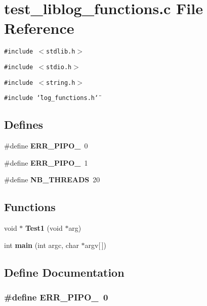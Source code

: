 \section{test\_\-liblog\_\-functions.c File Reference}
\label{test__liblog__functions_8c}
{\tt \#include $<$stdlib.h$>$}\par
{\tt \#include $<$stdio.h$>$}\par
{\tt \#include $<$string.h$>$}\par
{\tt \#include \char`\"{}log\_\-functions.h\char`\"{}}\par
\subsection*{Defines}
\begin{CompactItemize}
\item 
\#define {\bf ERR\_\-PIPO\_}~0
\item 
\#define {\bf ERR\_\-PIPO\_}~1
\item 
\#define {\bf NB\_\-THREADS}~20
\end{CompactItemize}
\subsection*{Functions}
\begin{CompactItemize}
\item 
void $\ast$ {\bf Test1} (void $\ast$arg)
\item 
int {\bf main} (int argc, char $\ast$argv[$\,$])
\end{CompactItemize}


\subsection{Define Documentation}
\subsubsection[{ERR\_\-PIPO\_\-1}]{\setlength{\rightskip}{0pt plus 5cm}\#define ERR\_\-PIPO\_~0}\label{test__liblog__functions_8c_c070539a3da334a15b47bc50ae924e8e}


